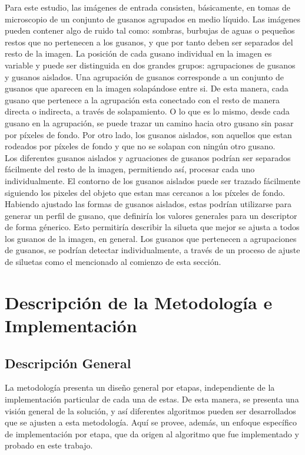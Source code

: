 Para este estudio, las im\'agenes de entrada consisten, b\'asicamente, en
tomas de microscopio de un conjunto de gusanos agrupados en medio 
l\'iquido. Las im\'agenes pueden contener algo de ruido tal como: 
sombras, burbujas de aguas o peque\~nos restos que no pertenecen a
los gusanos, y que por tanto deben ser separados del resto de la imagen. La
posici\'on de cada gusano individual en la imagen es variable y puede
ser distinguida en dos grandes grupos: agrupaciones de gusanos y gusanos aislados.
Una agrupaci\'on de gusanos corresponde a un conjunto de gusanos que aparecen en la
imagen solap\'andose entre si. De esta manera, cada gusano que pertenece
a la agrupaci\'on esta conectado con el resto de manera directa o indirecta,
 a trav\'es de solapamiento. O lo que es lo mismo, desde cada gusano en la agrupaci\'on,
se puede trazar un camino hacia otro gusano sin pasar por p\'ixeles de fondo.  
Por otro lado, los gusanos aislados, son aquellos que estan rodeados por
p\'ixeles de fondo y que no se solapan con ning\'un otro gusano.\\

Los diferentes gusanos aislados y agruaciones de gusanos podr\'ian ser
separados f\'acilmente del resto de la imagen, permitiendo as\'i, 
procesar cada uno individualmente. El contorno de los gusanos aislados
puede ser trazado f\'acilmente siguiendo los pixeles del objeto que
estan mas cercanos a los p\'ixeles de fondo. Habiendo ajustado las formas
de gusanos aislados, estas podr\'ian utilizarse para generar un perfil
de gusano, que definir\'ia los valores generales para un descriptor de forma
g\'enerico. Esto permitir\'ia describir la silueta que mejor se ajusta a todos
los gusanos de la imagen, en general.
Los gusanos que pertenecen a agrupaciones de gusanos, se podr\'ian detectar
individualmente, a trav\'es de un proceso de ajuste de siluetas como
el mencionado al comienzo de esta secci\'on.

\section{Descripci\'on de la Metodolog\'ia e Implementaci\'on}
\label{met:description}

\subsection{Descripci\'on General}

La metodolog\'ia presenta un dise\~no general por etapas, 
independiente de la implementaci\'on particular de cada una de estas. De esta
manera, se presenta una visi\'on general de la soluci\'on, y as\'i diferentes
algoritmos pueden ser desarrollados que se ajusten a esta metodolog\'ia.
Aqu\'i se provee, adem\'as, un enfoque espec\'ifico de implementaci\'on por etapa, que da
origen al algoritmo que fue implementado y probado en este trabajo.\\


